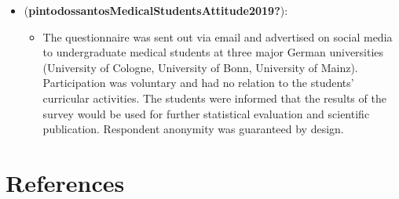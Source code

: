 \documentclass[
  man]{apa7}
\providecommand{\tightlist}{%
  \setlength{\itemsep}{0pt}\setlength{\parskip}{0pt}}
\begin{document}
\begin{itemize}
\tightlist
\item
  (\textbf{pintodossantosMedicalStudentsAttitude2019?}):

  \begin{itemize}
  \tightlist
  \item
    The questionnaire was sent out via email and advertised on social media to undergraduate medical students at three major German universities (University of Cologne, University of Bonn, University of Mainz). Participation was voluntary and had no relation to the students' curricular activities. The students were informed that the results of the survey would be used for further statistical evaluation and scientific publication. Respondent anonymity was guaranteed by design.
  \end{itemize}
\end{itemize}

\newpage

\hypertarget{references}{%
\section{References}\label{references}}
\end{document}
